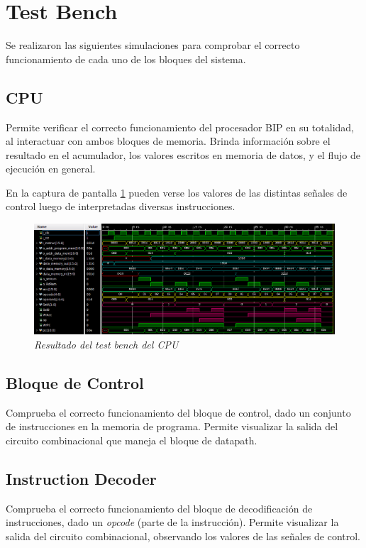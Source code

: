 \documentclass[12pt,A4paper,titlepage]{article}
\begin{document}
\section{Test Bench}
Se realizaron las siguientes simulaciones para comprobar el correcto funcionamiento de cada uno de los bloques del sistema.

\subsection{CPU}
Permite verificar el correcto funcionamiento del procesador BIP en su totalidad, al interactuar con ambos bloques de memoria. Brinda información sobre el resultado en el acumulador, los valores escritos en memoria de datos, y el flujo de ejecución en general.

En la captura de pantalla \ref{fig:tb-CPU} pueden verse los valores de las distintas señales de control luego de interpretadas diversas instrucciones.

\begin{figure}[h] 
	\centering
	\includegraphics[width=\textwidth]{figure/tb-CPU.png}
	\caption{\textit{Resultado del test bench del CPU}}
    \label{fig:tb-CPU}
\end{figure}

\subsection{Bloque de Control}
Comprueba el correcto funcionamiento del bloque de control, dado un conjunto de instrucciones en la memoria de programa. Permite visualizar la salida del circuito combinacional que maneja el bloque de datapath.

\subsection{Instruction Decoder}
Comprueba el correcto funcionamiento del bloque de decodificación de instrucciones, dado un \textit{opcode} (parte de la instrucción). Permite visualizar la salida del circuito combinacional, observando los valores de las señales de control.
\end{document}
